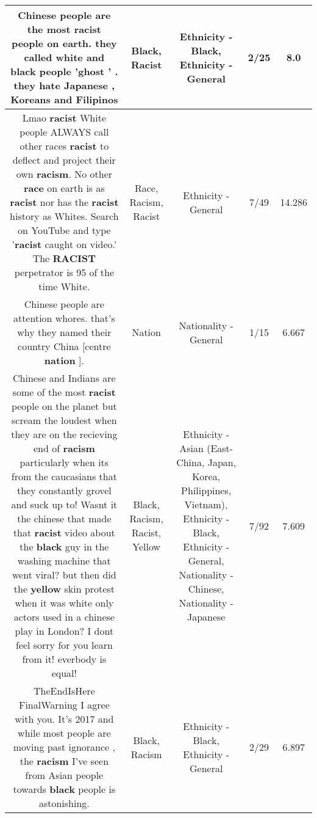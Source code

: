 \documentclass[11pt]{article}
\newlength\mylength
\begin{document}
\begin{center}
\begin{longtable}{|C{.65\mylength}|C{.30\mylength}|C{.12\mylength}|C{.12\mylength}|C{.12\mylength}|}
  \small Chinese people are the most \textbf{racist} people on earth. they called white and \textbf{black} people 'ghost ' . they hate Japanese , Koreans and Filipinos\normalsize   & Black, Racist & Ethnicity - Black, Ethnicity - General & 2/25 & 8.0 \\  \hline
  \small Lmao \textbf{racist} White people ALWAYS call other races \textbf{racist} to deflect and project their own \textbf{racism}. No other \textbf{race} on earth is as \textbf{racist} nor has the \textbf{racist} history as Whites. Search on YouTube and type '\textbf{racist} caught on video.' The \textbf{RACIST} perpetrator is 95 of the time White.\normalsize   & Race, Racism, Racist & Ethnicity - General & 7/49 & 14.286 \\  \hline
  \small Chinese people are attention whores. that's why they named their country China [centre \textbf{nation} ].\normalsize   & Nation & Nationality - General & 1/15 & 6.667 \\  \hline
  \small Chinese and Indians are some of the most \textbf{racist} people on the planet but scream the loudest when they are on the recieving end of \textbf{racism} particularly when its from the caucasians that they constantly grovel and suck up to! Wasnt it the chinese that made that \textbf{racist} video about the \textbf{black} guy in the washing machine that went viral? but then did the \textbf{y\textbf{e\textbf{llow}}} skin protest when it was white only actors used in a chinese play in London? I dont feel sorry for you learn from it! everbody is equal!\normalsize   & Black, Racism, Racist, Yellow & Ethnicity - Asian (East- China, Japan, Korea, Philippines, Vietnam), Ethnicity - Black, Ethnicity - General, Nationality - Chinese, Nationality - Japanese & 7/92 & 7.609 \\  \hline
  \small TheEndIsHere FinalWarning I agree with you. It's 2017 and while most people are moving past ignorance , the \textbf{racism} I've seen from Asian people towards \textbf{black} people is astonishing.\normalsize   & Black, Racism & Ethnicity - Black, Ethnicity - General & 2/29 & 6.897 \\  \hline

\end{longtable}
\end{center}
\end{document}

